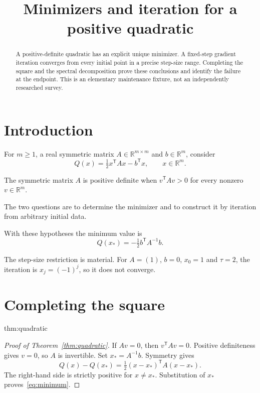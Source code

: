 \documentclass[12pt,reqno]{amsart}
\title[Minimizers and iteration]{Minimizers and iteration for a positive quadratic}
\date{}
\begin{document}
\begin{abstract}
A positive-definite quadratic has an explicit unique minimizer. A fixed-step
gradient iteration converges from every initial point in a precise step-size
range. Completing the square and the spectral decomposition prove these
conclusions and identify the failure at the endpoint. This is an elementary
maintenance fixture, not an independently researched survey.
\end{abstract}
\maketitle
\tableofcontents

\section{Introduction}\label{sec:introduction}
For $m\geq1$, a real symmetric matrix $A\in\mathbb R^{m\times m}$ and
$b\in\mathbb R^m$, consider
\[
Q(x)=\tfrac12 x^{\mathsf T}Ax-b^{\mathsf T}x,\qquad x\in\mathbb R^m.
\]
\begin{definition}\label{def:positive}
The symmetric matrix $A$ is positive definite when
$v^{\mathsf T}Av>0$ for every nonzero $v\in\mathbb R^m$.
\end{definition}
The two questions are to determine the minimizer and to construct it by
iteration from arbitrary initial data.

\begin{theorem}\label{thm:quadratic}

\end{theorem}
With these hypotheses the minimum value is
\begin{equation}\label{eq:minimum}
Q(x_*)=-\tfrac12 b^{\mathsf T}A^{-1}b.
\end{equation}

\begin{theorem}\label{thm:gradient}

\end{theorem}
The step-size restriction is material. For $A=(1)$, $b=0$, $x_0=1$ and
$\tau=2$, the iteration is $x_j=(-1)^j$, so it does not converge.

\section{Completing the square}\label{sec:square}
\begin{theoremrecall}{thm:quadratic}

\end{theoremrecall}
\begin{proof}[Proof of Theorem~\ref{thm:quadratic}]
If $Av=0$, then $v^{\mathsf T}Av=0$. Positive definiteness gives $v=0$,
so $A$ is invertible. Set $x_*=A^{-1}b$. Symmetry gives
\[
Q(x)-Q(x_*)=\tfrac12(x-x_*)^{\mathsf T}A(x-x_*).
\]
The right-hand side is strictly positive for $x\ne x_*$. Substitution of
$x_*$ proves~\eqref{eq:minimum}.
\end{proof}
\end{document}
